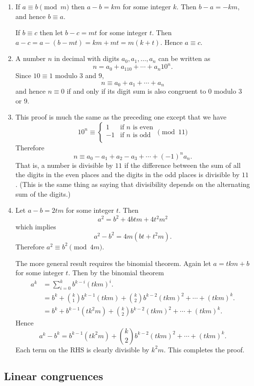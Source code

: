 \documentclass[a4paper,10pt]{article}
\begin{document}
\begin{enumerate}
\item If \(a\equiv b\pmod{m}\) then \(a-b=km\) for some integer \(k\).
  Then \(b-a=-km\), and hence \(b\equiv a\).

  If \(b\equiv c\) then let \(b-c=mt\) for some integer \(t\).
  Then \(a-c=a-(b-mt)=km+mt=m(k+t)\). Hence \(a\equiv c\).
\item A number \(n\) in decimal with digits \(a_0,a_1,\ldots,a_n\)
  can be written as \[n=a_0+a_110+\cdots+a_n10^n.\]
  Since \(10\equiv 1\) modulo \(3\) and \(9\),
  \[n\equiv a_0+a_1+\cdots+a_n\] and hence \(n\equiv 0\) if and only
  if its digit sum is also congruent to \(0\) modulo \(3\) or \(9\).
\item This proof is much the same as the preceding one except that we
  have
  \[ 10^n\equiv 
    \begin{cases}
      1& \text{if } n \text{ is even}\\
      -1& \text{if } n \text{ is odd}\\
    \end{cases}
    \pmod{11}
  \]
  Therefore \[n\equiv a_0-a_1+a_2-a_3+\cdots+(-1)^na_n.\]
  That is, a number is divisible by \(11\) if the difference between
  the sum of all the digits in the even places and the digits in the
  odd places is divisible by \(11\). (This is the same thing as saying
  that divisibility depends on the alternating sum of the digits.)
\item Let \(a-b=2tm\) for some integer \(t\). Then \[a^2=b^2+4btm+4t^2m^2\]
  which implies \[a^2-b^2=4m(bt+t^2m).\]
  Therefore \(a^2\equiv b^2\pmod{4m}\).

  The more general result requires the binomial theorem. Again let \(a=tkm+b\) for some
  integer \(t\). Then by the binomial theorem
  \[
    \begin{split}
    a^k&=\sum_{i=0}^{k}b^{k-i}(tkm)^i.\\
       &=b^k+\binom{k}{1}b^{k-1}(tkm)+\binom{k}{2}b^{k-2}(tkm)^2+\cdots+(tkm)^k.\\
      &=b^k+b^{k-1}(tk^2m)+\binom{k}{2}b^{k-2}(tkm)^2+\cdots+(tkm)^k.
    \end{split}
  \]
  Hence \[a^k-b^k=b^{k-1}(tk^2m)+\binom{k}{2}b^{k-2}(tkm)^2+\cdots+(tkm)^k.\]
  Each term on the RHS is clearly divisible by \(k^2m\). This completes the proof.

\end{enumerate}
\subsection{Linear congruences}
\end{document}
